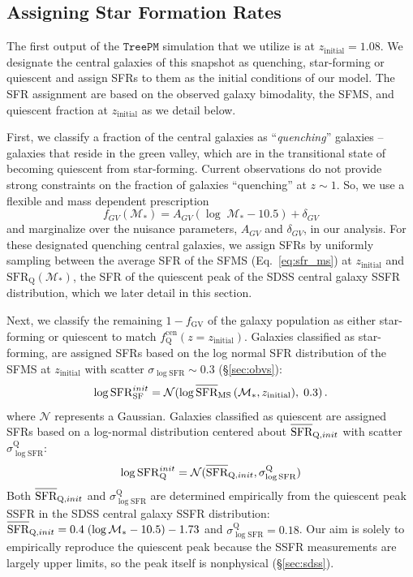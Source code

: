 \documentclass[iop,apj,tighten,twocolappendix,numberedappendix]{emulateapj}
\newcommand{\beq}{\begin{equation}}
\newcommand{\eeq}{\end{equation}}
\newcommand{\avgSFR}{\overline{\raisebox{0pt}[1.2\height]{SFR}}}
\newcommand{\SFR}{\mathrm{SFR}}
\newcommand{\fqcen}{f_\mathrm{Q}^\mathrm{cen}}
\newcommand{\zinit}{z_\mathrm{initial}}
\begin{document}
\subsection{Assigning Star Formation Rates} \label{sec:sfr_assign}
The first output of the $\mathtt{TreePM}$ simulation that we 
utilize is at $z_\mathrm{initial} = 1.08$. We designate the central
galaxies of this snapshot as quenching, star-forming or quiescent
and assign SFRs to them as the initial conditions of our model. 
The SFR assignment are based on the observed galaxy bimodality, 
the SFMS, and quiescent fraction at $z_\mathrm{initial}$ as we 
detail below.

First, we classify a fraction of the central galaxies as 
``{\em quenching}'' galaxies -- galaxies that reside in the 
green valley, which are in the transitional state of becoming 
quiescent from star-forming. Current observations do not provide 
strong constraints on the fraction of galaxies ``quenching''
at $z \sim 1$. So, we use a flexible and mass dependent prescription  
\begin{equation} \label{eq:f_gv}
f_{GV}(\mathcal{M}_*) = A_{GV} (\log\;\mathcal{M}_* - 10.5) + \delta_{GV}
\end{equation}
and marginalize over the nuisance parameters, $A_{GV}$ and $\delta_{GV}$, 
in our analysis. For these designated quenching central galaxies,
we assign SFRs by uniformly sampling between the average SFR of the 
SFMS (Eq.~\ref{eq:sfr_ms}) at $z_\mathrm{initial}$ and 
$\mathrm{SFR}_\mathrm{Q}(\mathcal{M}_*)$, the 
SFR of the quiescent peak of the SDSS central galaxy SSFR 
distribution, which we later detail in this section.  

Next, we classify the remaining $1 - f_\mathrm{GV}$ of the galaxy population  
as either star-forming or quiescent to match $\fqcen(z=\zinit)$. 
Galaxies classified as star-forming, are assigned SFRs based on the 
log normal SFR distribution of the SFMS at $\zinit$ with scatter 
$\sigma_{\log \SFR} \sim 0.3$ 
(\S \ref{sec:obvs}):
\beq
\log \mathrm{SFR}_\mathrm{SF}^{init} = \mathcal{N} (\log \avgSFR_\mathrm{MS}
\left(\mathcal{M}_*, \zinit), \;0.3 \right).
\eeq
where $\mathcal{N}$ represents a Gaussian.
Galaxies classified as quiescent are assigned SFRs based on a 
log-normal distribution centered about $\avgSFR_{\mathrm{Q},init}$ 
with scatter $\sigma_{\log \SFR}^\mathrm{Q}$: 
\beq
\log \mathrm{SFR}_\mathrm{Q}^{init} = 
\mathcal{N}(\avgSFR_{\mathrm{Q}, init}, \sigma_{\log \mathrm{SFR}}^\mathrm{Q})
\eeq
Both $\avgSFR_{\mathrm{Q},init}$ and 
$\sigma_{\log \mathrm{SFR}}^\mathrm{Q}$ are determined 
empirically from the quiescent peak SSFR in the SDSS 
central galaxy SSFR distribution: 
$\avgSFR_{\mathrm{Q}, init} = 0.4\;(\log\mathcal{M}_* - 10.5) - 1.73$
and $\sigma_{\log \mathrm{SFR}}^\mathrm{Q} = 0.18$.
Our aim is solely to empirically reproduce the quiescent peak because the 
SSFR measurements are largely upper limits, so the peak itself is nonphysical 
(\S \ref{sec:sdss}). 
\end{document}
